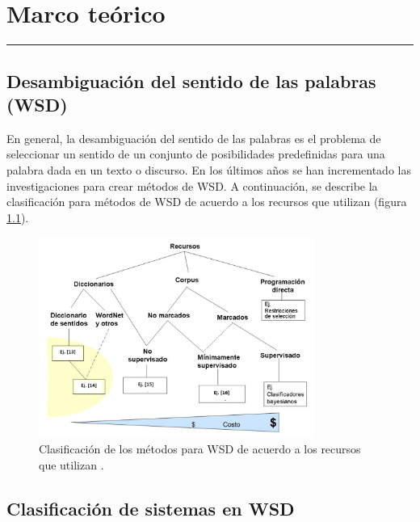 \chapter{Marco teórico}
\hrule \bigskip \vspace*{1cm}

\section{Desambiguación del sentido de las palabras (WSD)}
En general, la desambiguación del sentido de las palabras es el problema de seleccionar un sentido de un conjunto de posibilidades predefinidas para una palabra dada en un texto o discurso.
En los últimos años se han incrementado las investigaciones para crear métodos de WSD. A continuación, se describe la clasificación para métodos de WSD de acuerdo a los recursos que utilizan (figura \ref{fig:desambiguacion_WSD}).

  \begin{figure}[h!]
	  \begin{center}
    \includegraphics[angle=0, width=9cm]{Graficos/desambiguacion_WSD}
	  \caption{Clasificación de los métodos para WSD de acuerdo a los recursos que utilizan \cite{001}.}
    \label{fig:desambiguacion_WSD}
    \end{center}
\end{figure}

\section{Clasificación de sistemas en WSD}
